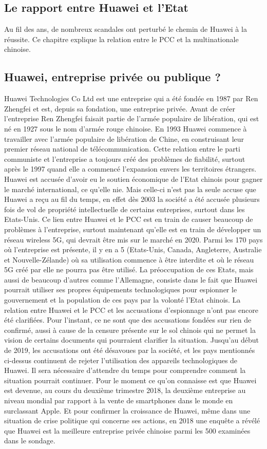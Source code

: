 \subsection{Le rapport entre Huawei et l’Etat}
Au fil des ans, de nombreux scandales ont perturbé le chemin de Huawei à la réussite. Ce chapitre explique la relation entre le PCC et la multinationale chinoise.
\subsection{Huawei, entreprise privée ou publique ?}
Huawei Technologies Co Ltd est une entreprise qui a été fondée en 1987 par Ren Zhengfei et est, depuis sa fondation, une entreprise privée.  Avant de créer l’entreprise Ren Zhengfei faisait partie de l’armée populaire de libération, qui est né en 1927 sous le nom d’armée rouge chinoise.  En 1993 Huawei commence à travailler avec l’armée populaire de libération de Chine, en construisant leur premier réseau national de télécommunication. Cette relation entre le parti communiste et l’entreprise a toujours créé des problèmes de fiabilité, surtout après le 1997 quand elle a commencé l’expansion envers les territoires étrangers. Huawei est accusée d’avoir eu le soutien économique de l’Etat chinois pour gagner le marché international, ce qu’elle nie.  Mais celle-ci n’est pas la seule accuse que Huawei a reçu au fil du temps, en effet dès 2003 la société a été accusée plusieurs fois de vol de propriété intellectuelle de certains entreprises, surtout dans les Etats-Unis.  Ce lien entre Huawei et le PCC est en train de causer beaucoup de problèmes à l’entreprise, surtout maintenant qu’elle est en train de développer un réseau wireless 5G, qui devrait être mis sur le marché en 2020.   Parmi les 170 pays où l’entreprise est présente, il y en a 5 (Etats-Unis, Canada, Angleterre, Australie et Nouvelle-Zélande)  où sa utilisation commence à être interdite et où le réseau 5G créé par elle ne pourra pas être utilisé.  La préoccupation de ces Etats, mais aussi de beaucoup d’autres comme l’Allemagne, consiste dans le fait que Huawei pourrait utiliser ses propres équipements technologiques pour espionner le gouvernement et la population de ces pays par la volonté l’Etat chinois.  La relation entre Huawei et le PCC et les accusations d’espionnage n’ont pas encore été clarifiées. Pour l’instant, ce ne sont que des accusations fondées sur rien de confirmé, aussi à cause de la censure présente sur le sol chinois qui ne permet la vision de certains documents qui pourraient clarifier la situation. Jusqu’au début de 2019, les accusations ont été désavoues par la société,  et les pays mentionnés ci-dessus continuent de rejeter l’utilisation des appareils technologiques de Huawei.  Il sera nécessaire d’attendre du temps pour comprendre comment la situation pourrait continuer. Pour le moment ce qu’on connaisse est que Huawei est devenue, au cours du deuxième trimestre 2018, la deuxième entreprise au niveau mondial par rapport à la vente de smartphones dans le monde en surclassant Apple.  Et pour confirmer la croissance de Huawei, même dans une situation de crise politique qui concerne ses actions, en 2018 une enquête a révélé que Huawei est la meilleure entreprise privée chinoise parmi les 500 examinées dans le sondage.  